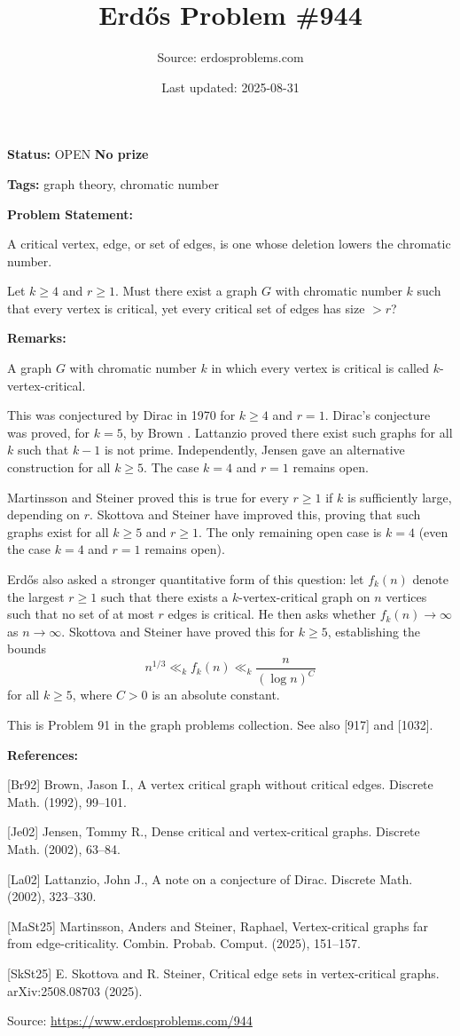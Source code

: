 \documentclass{article}
\title{Erd\H{o}s Problem \#944}
\date{Last updated: 2025-08-31}
\author{Source: erdosproblems.com}
\begin{document}
\maketitle

\noindent\textbf{Status:} OPEN \quad \textbf{No prize}

\noindent\textbf{Tags:} graph theory, chromatic number

\medskip
\noindent\textbf{Problem Statement:}

A critical vertex, edge, or set of edges, is one whose deletion lowers the chromatic number.

Let $k\geq 4$ and $r\geq 1$. Must there exist a graph $G$ with chromatic number $k$ such that every vertex is critical, yet every critical set of edges has size $>r$?

\bigskip
\noindent\textbf{Remarks:}

A graph $G$ with chromatic number $k$ in which every vertex is critical is called $k$-vertex-critical.

This was conjectured by Dirac in 1970 for $k\geq 4$ and $r=1$. Dirac's conjecture was proved, for $k=5$, by Brown \cite{Br92}. Lattanzio \cite{La02} proved there exist such graphs for all $k$ such that $k-1$ is not prime. Independently, Jensen \cite{Je02} gave an alternative construction for all $k\geq 5$. The case $k=4$ and $r=1$ remains open.

Martinsson and Steiner \cite{MaSt25} proved this is true for every $r\geq 1$ if $k$ is sufficiently large, depending on $r$. Skottova and Steiner \cite{SkSt25} have improved this, proving that such graphs exist for all $k\geq 5$ and $r\geq 1$. The only remaining open case is $k=4$ (even the case $k=4$ and $r=1$ remains open).

Erd\H{o}s also asked a stronger quantitative form of this question: let $f_k(n)$ denote the largest $r\geq 1$ such that there exists a $k$-vertex-critical graph on $n$ vertices such that no set of at most $r$ edges is critical. He then asks whether $f_k(n)\to \infty$ as $n\to \infty$. Skottova and Steiner \cite{SkSt25} have proved this for $k\geq 5$, establishing the bounds\[n^{1/3}\ll_k f_k(n) \ll_k \frac{n}{(\log n)^C}\]for all $k\geq 5$, where $C>0$ is an absolute constant.

This is Problem 91 in the graph problems collection. See also [917] and [1032].

\bigskip
\noindent\textbf{References:}

[Br92] Brown, Jason I., A vertex critical graph without critical edges. Discrete Math. (1992), 99--101.
 
 [Je02] Jensen, Tommy R., Dense critical and vertex-critical graphs. Discrete Math. (2002), 63--84.
 
 [La02] Lattanzio, John J., A note on a conjecture of {D}irac. Discrete Math. (2002), 323--330.
 
 [MaSt25] Martinsson, Anders and Steiner, Raphael, Vertex-critical graphs far from edge-criticality. Combin. Probab. Comput. (2025), 151--157.
 
 [SkSt25] E. Skottova and R. Steiner, Critical edge sets in vertex-critical graphs. arXiv:2508.08703 (2025).

\bigskip
\noindent\small{Source: \url{https://www.erdosproblems.com/944}}
\end{document}
